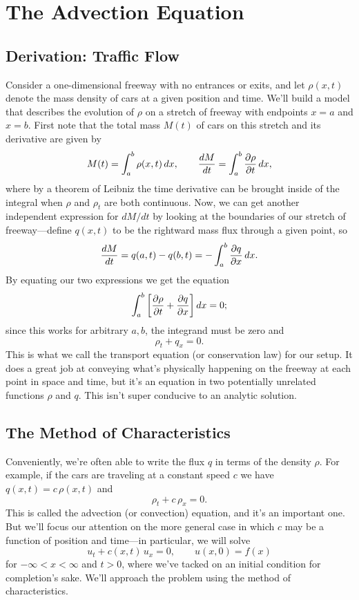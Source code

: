 \documentclass[../m180main.tex]{subfiles}
\begin{document}
\chapter{The Advection Equation}
\section{Derivation: Traffic Flow}
Consider a one-dimensional freeway with no entrances or exits, and let $\rho(x,t)$ denote the mass density of cars at a given position and time.
We'll build a model that describes the evolution of $\rho$ on a stretch of freeway with endpoints $x=a$ and $x=b$.
First note that the total mass $M(t)$ of cars on this stretch and its derivative are given by
\[ M(t) = \int_{a}^{b} \rho(x,t) \,dx, \qquad \frac{dM}{dt} = \int_{a}^{b} \frac{\partial \rho}{\partial t} \,dx, \]
where by a theorem of Leibniz the time derivative can be brought inside of the integral when $\rho$ and $\rho_t$ are both continuous.
Now, we can get another independent expression for $dM / dt$ by looking at the boundaries of our stretch of freeway---define $q(x,t)$ to be the rightward mass flux through a given point, so
\[ \frac{dM}{dt} = q(a,t) - q(b,t) = - \int_{a}^{b} \frac{\partial q}{\partial x} \,dx. \]
By equating our two expressions we get the equation
\[ \int_{a}^{b} \left[ \frac{\partial \rho}{\partial t} + \frac{\partial q}{\partial x} \right] dx = 0; \]
since this works for arbitrary $a,b$, the integrand must be zero and
\[ \rho_t + q_x = 0. \]
This is what we call the transport equation (or conservation law) for our setup.
It does a great job at conveying what's physically happening on the freeway at each point in space and time, but it's an equation in two potentially unrelated functions $\rho$ and $q$.
This isn't super conducive to an analytic solution.

\section{The Method of Characteristics}
Conveniently, we're often able to write the flux $q$ in terms of the density $\rho$.
For example, if the cars are traveling at a constant speed $c$ we have $q(x,t) = c \,\rho(x,t)$ and
\[ \rho_t + c \,\rho_x = 0. \]
This is called the advection (or convection) equation, and it's an important one.
But we'll focus our attention on the more general case in which $c$ may be a function of position and time---in particular, we will solve
\[ u_t + c(x,t) \,u_x = 0, \qquad u(x,0) = f(x) \]
for $-\infty < x < \infty$ and $t > 0$, where we've tacked on an initial condition for completion's sake.
We'll approach the problem using the method of characteristics.
\end{document}
